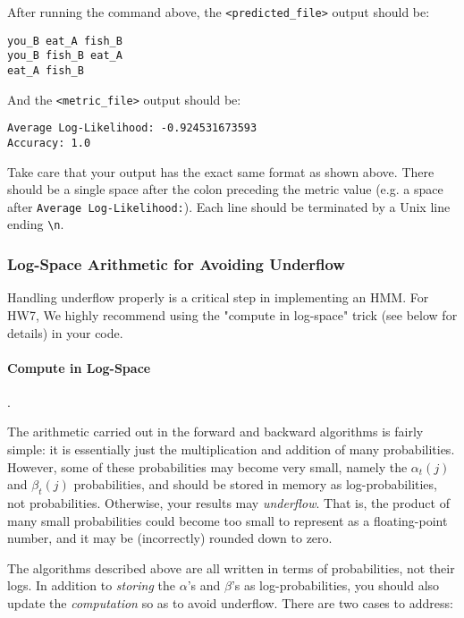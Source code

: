 \documentclass{article}
\begin{document}
After running the command above, the \texttt{<predicted\_file>} output should be:

\begin{lstlisting}
you_B eat_A fish_B
you_B fish_B eat_A
eat_A fish_B
\end{lstlisting}

And the \texttt{<metric\_file>} output should be:

\begin{lstlisting}
Average Log-Likelihood: -0.924531673593
Accuracy: 1.0
\end{lstlisting}

Take care that your output has the exact same format as shown above. There should be a single space after the colon preceding the metric value (e.g. a space after \lstinline{Average Log-Likelihood:}). Each line should be terminated by a Unix line ending \lstinline{\n}.



\subsubsection{Log-Space Arithmetic for Avoiding Underflow}
\label{sec:underflow}

Handling underflow properly is a critical step in implementing an HMM. For HW7, We highly recommend using the "compute in log-space" trick (see below for details) in your code.

\paragraph{Compute in Log-Space}. 

The arithmetic carried out in the forward and backward algorithms is fairly simple: it is essentially just the multiplication and addition of many probabilities. However, some of these probabilities may become very small, namely the $\alpha_t(j)$ and $\beta_t(j)$ probabilities, and should be stored in memory as log-probabilities, not probabilities. Otherwise, your results may \emph{underflow}. That is, the product of many small probabilities could become too small to represent as a floating-point number, and it may be (incorrectly) rounded down to zero.

The algorithms described above are all written in terms of probabilities, not their logs. In addition to \emph{storing} the $\alpha$'s and $\beta$'s as log-probabilities, you should also update the \emph{computation} so as to avoid underflow. There are two cases to address:
\end{document}
